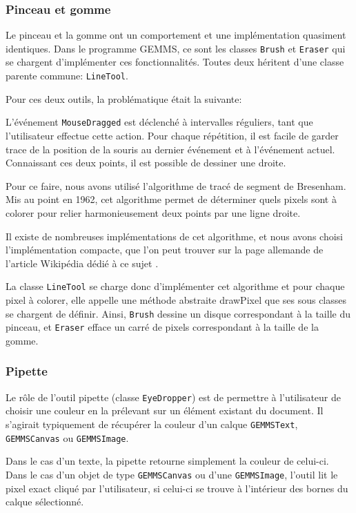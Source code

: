 \subsubsection{Pinceau et gomme}
Le pinceau et la gomme ont un comportement et une implémentation quasiment identiques. Dans le programme GEMMS, ce sont les classes \texttt{Brush} et \texttt{Eraser} qui se chargent d'implémenter ces fonctionnalités. Toutes deux héritent d'une classe parente commune: \texttt{LineTool}.
\par
Pour ces deux outils, la problématique était la suivante:
\par
L'événement \texttt{MouseDragged} est déclenché à intervalles réguliers, tant que l'utilisateur effectue cette action. Pour chaque répétition, il est facile de garder trace de la position de la souris au dernier événement et à l'événement actuel. Connaissant ces deux points, il est possible de dessiner une droite.
\par
Pour ce faire, nous avons utilisé l'algorithme de tracé de segment de Bresenham. Mis au point en 1962, cet algorithme permet de déterminer quels pixels sont à colorer pour relier harmonieusement deux points par une ligne droite.
\par
Il existe de nombreuses implémentations de cet algorithme, et nous avons choisi l'implémentation compacte, que l'on peut trouver sur la page allemande de l'article Wikipédia dédié à ce sujet \cite{Bresenham}.
\par
La classe \texttt{LineTool} se charge donc d'implémenter cet algorithme et pour chaque pixel à colorer, elle appelle une méthode abstraite drawPixel que ses sous classes se chargent de définir. Ainsi, \texttt{Brush} dessine un disque correspondant à la taille du pinceau, et \texttt{Eraser} efface un carré de pixels correspondant à la taille de la gomme.
\subsubsection{Pipette}
Le rôle de l'outil pipette (classe \texttt{EyeDropper}) est de permettre à l'utilisateur de choisir une couleur en la prélevant sur un élément existant du document. Il s'agirait typiquement de récupérer la couleur d'un calque \texttt{GEMMSText}, \texttt{GEMMSCanvas} ou \texttt{GEMMSImage}.
\par
Dans le cas d'un texte, la pipette retourne simplement la couleur de celui-ci. Dans le cas d'un objet de type \texttt{GEMMSCanvas} ou d'une \texttt{GEMMSImage}, l'outil lit le pixel exact cliqué par l'utilisateur, si celui-ci se trouve à l'intérieur des bornes du calque sélectionné.
